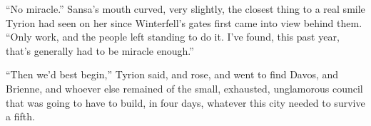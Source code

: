 “No miracle.” Sansa’s mouth curved, very slightly, the closest thing to a real smile Tyrion had seen on her since Winterfell’s gates first came into view behind them. “Only work, and the people left standing to do it. I’ve found, this past year, that’s generally had to be miracle enough.”

“Then we’d best begin,” Tyrion said, and rose, and went to find Davos, and Brienne, and whoever else remained of the small, exhausted, unglamorous council that was going to have to build, in four days, whatever this city needed to survive a fifth.